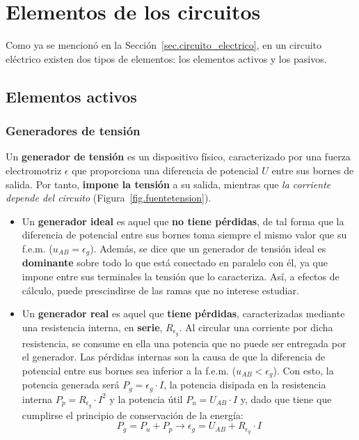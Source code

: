 \documentclass[11pt]{book} %
\begin{document}
	\section{Elementos de los circuitos}
	Como ya se mencionó en la Sección~\ref{sec.circuito_electrico}, en un circuito eléctrico existen dos tipos de elementos: los elementos activos y los pasivos.
	
	\subsection{Elementos activos}\label{sec.elementos_activos}
	
	\subsubsection{Generadores de tensión}
	Un \textbf{generador de tensión} es un dispositivo físico, caracterizado por una fuerza electromotriz $\epsilon$ que proporciona una diferencia de potencial $U$ entre sus bornes de salida. Por tanto, \textbf{impone la tensión} a su salida, mientras que \emph{la corriente depende del circuito} (Figura~\ref{fig.fuentetension}).
	\begin{itemize}
		\item Un \textbf{generador ideal} es aquel que \textbf{no tiene pérdidas}, de tal forma que la diferencia de potencial entre sus bornes toma siempre el mismo valor que su f.e.m. ($u_{AB}=\epsilon_g$). Además, se dice que un generador de tensión ideal es \textbf{dominante} sobre todo lo que está conectado en paralelo con él, ya que impone entre sus terminales la tensión que lo caracteriza. Así, a efectos de cálculo, puede prescindirse de las ramas que no interese estudiar.
		\item Un \textbf{generador real} es aquel que \textbf{tiene pérdidas}, caracterizadas mediante una resistencia interna, en \textbf{serie}, $R_{\epsilon_g}$. Al circular una corriente por dicha resistencia, se consume en ella una potencia que no puede ser entregada por el generador. Las pérdidas internas son la causa de que la diferencia de potencial entre sus bornes sea inferior a la f.e.m. ($u_{AB}<\epsilon_g$). Con esto, la potencia generada será $P_g=\epsilon_g\cdot I$, la potencia disipada en la resistencia interna $P_p=R_{\epsilon_g}\cdot I^2$ y la potencia útil $P_u=U_{AB}\cdot I$ y, dado que tiene que cumplirse el principio de conservación de la energía:
		\begin{equation}
			P_g=P_u+P_p\rightarrow \boxed{ \epsilon_g=U_{AB}+ R_{\epsilon_g}\cdot I}
		\end{equation}
	\end{itemize}
\end{document}
